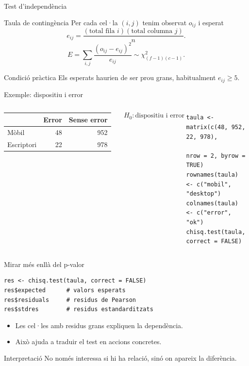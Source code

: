 \documentclass[10pt,aspectratio=169]{beamer}
\begin{document}
\begin{frame}[fragile]{Test d'independència}
\begin{block}{Taula de contingència}
Per cada cel·la $(i,j)$ tenim observat $o_{ij}$ i esperat
\[
e_{ij}=\frac{(\text{total fila }i)(\text{total columna }j)}{n}.
\]
\[
E=\sum_{i,j}\frac{(o_{ij}-e_{ij})^2}{e_{ij}}
\sim \chi^2_{(f-1)(c-1)}.
\]
\end{block}
\begin{alertblock}{Condició pràctica}
Els esperats haurien de ser prou grans, habitualment $e_{ij}\ge 5$.
\end{alertblock}
\end{frame}

\begin{frame}[fragile]{Exemple: dispositiu i error}
\begin{columns}[T]
\begin{tabular}{lrr}
\toprule
 & Error & Sense error\\
\midrule
Mòbil & 48 & 952\\
Escriptori & 22 & 978\\
\bottomrule
\end{tabular}
\vspace{0.3cm}
\[
H_0:\text{dispositiu i error són independents.}
\]
\begin{lstlisting}
taula <- matrix(c(48, 952, 22, 978),
                nrow = 2, byrow = TRUE)
rownames(taula) <- c("mobil", "desktop")
colnames(taula) <- c("error", "ok")
chisq.test(taula, correct = FALSE)
\end{lstlisting}
\end{columns}
\end{frame}

\begin{frame}[fragile]{Mirar més enllà del p-valor}
\begin{lstlisting}
res <- chisq.test(taula, correct = FALSE)
res$expected      # valors esperats
res$residuals     # residus de Pearson
res$stdres        # residus estandarditzats
\end{lstlisting}
\begin{itemize}
  \item Les cel·les amb residus grans expliquen la dependència.
  \item Això ajuda a traduir el test en accions concretes.
\end{itemize}
\begin{block}{Interpretació}
No només interessa si hi ha relació, sinó on apareix la diferència.
\end{block}
\end{frame}
\end{document}
